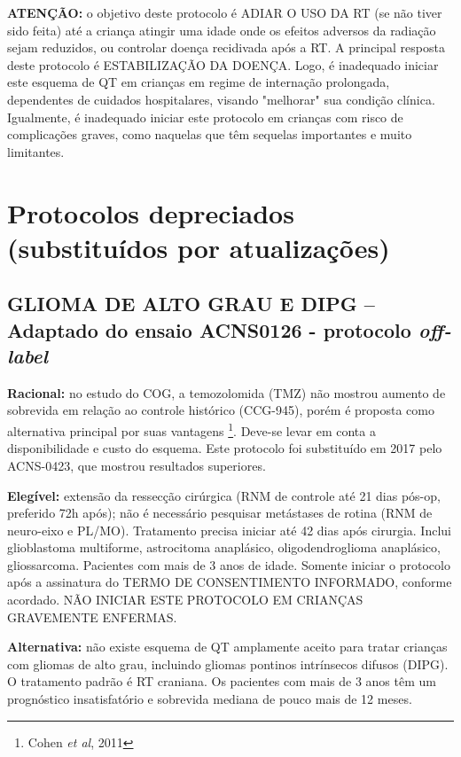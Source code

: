 \documentclass[11pt,a4paper,oldfontcommands]{memoir}
\begin{document}
\textbf{ATENÇÃO:} o objetivo deste protocolo é ADIAR O USO DA RT (se não tiver sido feita) até a criança atingir uma idade onde os efeitos adversos da radiação sejam reduzidos, ou controlar doença recidivada após a RT. A principal resposta deste protocolo é ESTABILIZAÇÃO DA DOENÇA. Logo, é inadequado iniciar este esquema de QT em crianças em regime de internação prolongada, dependentes de cuidados hospitalares, visando "melhorar" sua condição clínica. Igualmente, é inadequado iniciar este protocolo em crianças com risco de complicações graves, como naquelas que têm sequelas importantes e muito limitantes.\\

\cleardoublepage
\chapter{Protocolos depreciados (substituídos por atualizações)}
\cleardoublepage
\section{GLIOMA DE ALTO GRAU E DIPG -- Adaptado do ensaio ACNS0126 - protocolo \textit{off-label}}
{\let\thefootnote\relax{}}
\textbf{Racional:} no estudo do COG, a temozolomida (TMZ) não mostrou aumento de sobrevida em relação ao controle histórico (CCG-945), porém é proposta como alternativa principal por suas vantagens \footnote{Cohen \textit{et al}, 2011}. Deve-se levar em conta a disponibilidade e custo do esquema. Este protocolo foi substituído em 2017 pelo ACNS-0423, que mostrou resultados superiores.

\textbf{Elegível:} extensão da ressecção cirúrgica (RNM de controle até 21 dias pós-op, preferido 72h após); não é necessário pesquisar metástases de rotina (RNM de neuro-eixo e PL/MO). Tratamento precisa iniciar até 42 dias após cirurgia. Inclui glioblastoma multiforme, astrocitoma anaplásico, oligodendroglioma anaplásico, gliossarcoma. Pacientes com mais de 3 anos de idade. Somente iniciar o protocolo após a assinatura do TERMO DE CONSENTIMENTO INFORMADO, conforme acordado. NÃO INICIAR ESTE PROTOCOLO EM CRIANÇAS GRAVEMENTE ENFERMAS.

\textbf{Alternativa:} não existe esquema de QT amplamente aceito para tratar crianças com gliomas de alto grau, incluindo gliomas pontinos intrínsecos difusos (DIPG). O tratamento padrão é RT craniana. Os pacientes com mais de 3 anos têm um prognóstico insatisfatório e sobrevida mediana de pouco mais de 12 meses.
\end{document}
